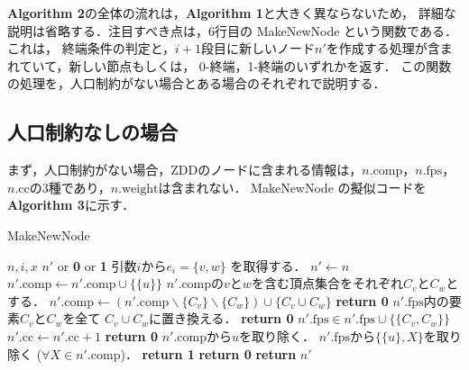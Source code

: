 \textbf{Algorithm 2}の全体の流れは，\textbf{Algorithm 1}と大きく異ならないため，
詳細な説明は省略する．注目すべき点は，6行目の MakeNewNode という関数である．これは，
終端条件の判定と，$i+1$段目に新しいノード$n'$を作成する処理が含まれていて，新しい節点もしくは，
0-終端，1-終端のいずれかを返す．
この関数の処理を，人口制約がない場合とある場合のそれぞれで説明する．

\subsection{人口制約なしの場合}

まず，人口制約がない場合，ZDDのノードに含まれる情報は，$n.\mathrm{comp}$，$n.\mathrm{fps}$，
$n.\mathrm{cc}$の3種であり，$n.\mathrm{weight}$は含まれない．
MakeNewNode の擬似コードを\textbf{Algorithm 3}に示す．

\begin{breakablealgorithm}
  \caption{MakeNewNode}
  \label{make_new_node}
  \begin{algorithmic}[1]
    \Require $n,i,x$
    \Ensure $n'$ or \textbf{0} or \textbf{1}
    \State 引数$i$から$e_i=\{v,w\}$ を取得する．
    \State $n' \gets n$
        \State $n'.\mathrm{comp} \gets n'.\mathrm{comp} \cup \{\{u\}\}$
      \EndIf
    \EndFor
    \State $n'.\mathrm{comp}$の$v$と$w$を含む頂点集合をそれぞれ$C_v$と$C_w$とする．
      \State $n'.\mathrm{comp} \gets (n'.\mathrm{comp} \backslash \{C_v\} \backslash \{C_w\})
        \cup \{C_v \cup C_w\}$
        \State \textbf{return 0}
      \Else
        \State $n'.\mathrm{fps}$内の要素$C_v$と$C_w$を全て
          $C_v \cup C_w$に置き換える．
      \EndIf
    \Else
        \State \textbf{return 0}
      \Else
        \State $n'.\mathrm{fps} \in n'.\mathrm{fps} \cup \{\{C_v, C_w\}\}$
      \EndIf
    \EndIf
        \State $n'.\mathrm{cc} \gets n'.\mathrm{cc} + 1$
          \State \textbf{return 0}
        \EndIf
      \EndIf
      \State $n'.\mathrm{comp}$から$u$を取り除く．
      \State $n'.\mathrm{fps}$から$\{\{u\},X\}$を取り除く
        ($\forall X \in n'.\mathrm{comp}$)．
    \EndIf
  \EndFor
      \State \textbf{return 1}
    \Else
      \State \textbf{return 0}
    \EndIf
  \EndIf
  \State \textbf{return }$n'$
  \end{algorithmic}
\end{breakablealgorithm}

